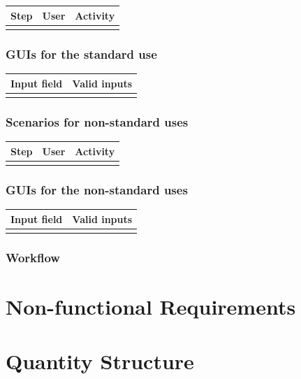 \documentclass[12pt]{article}
\theoremstyle{definition}
\begin{document}
\begin{tabular}{|l|l|l|}
\hline
Step & User & Activity \\ \hline
 & & \\ \hline
\end{tabular}

\subsubsection{GUIs for the standard use}

\begin{tabular}{|l|l|}
\hline
Input field & Valid inputs \\ \hline
 &  \\ \hline
\end{tabular}

\subsubsection{Scenarios for non-standard uses}

\begin{tabular}{|l|l|l|}
\hline
Step & User & Activity \\ \hline
 & & \\ \hline
\end{tabular}

\subsubsection{GUIs for the non-standard uses}

\begin{tabular}{|l|l|}
\hline
Input field & Valid inputs \\ \hline
 &  \\ \hline
\end{tabular}

\subsubsection{Workflow}

\pagebreak

\section{Non-functional Requirements}

\pagebreak

\section{Quantity Structure}
\end{document}
